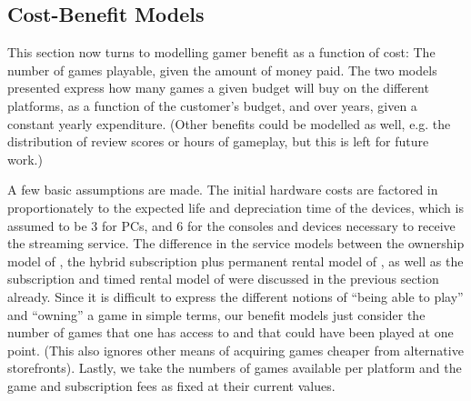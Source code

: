 %




\subsection{Cost-Benefit Models}\label{subsec:cost-benefit-models}

This section now turns to modelling gamer benefit as a function of cost: The number of games playable, given the amount of money paid. The two models presented express how many games a given budget will buy on the different platforms, as a function of the customer's budget, and over years, given a constant yearly expenditure. (Other benefits could be modelled as well, e.g. the distribution of review scores or hours of gameplay, but this is left for future work.)

A few basic assumptions are made. The initial hardware costs are factored in proportionately to the expected life and depreciation time of the devices, which is assumed to be \SI{3}{\year} for PCs, and \SI{6}{\year} for the consoles and devices necessary to receive the streaming service. %
The difference in the service models between the ownership model of \steam, the hybrid subscription plus permanent rental model of \gfnow, as well as the subscription and timed rental model of \psnow were discussed in the previous section already. Since it is difficult to express the different notions of ``being able to play'' and ``owning'' a game in simple terms, our benefit models just consider the number of games that one has access to and that could have been played at one point. (This also ignores other means of acquiring games cheaper from alternative storefronts).
Lastly, we take the numbers of games available per platform and the game and subscription fees as fixed at their current values.


